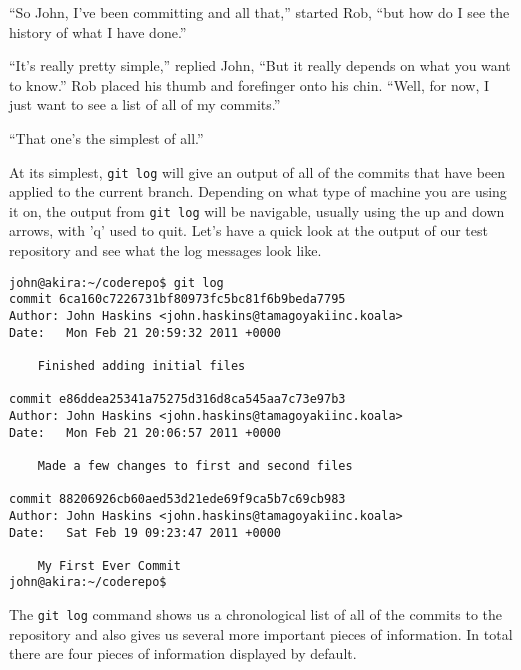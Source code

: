 \begin{trenches}
``So John, I've been committing and all that,'' started Rob, ``but how do I see the history of what I have done.''

``It's really pretty simple,'' replied John, ``But it really depends on what you want to know.''
Rob placed his thumb and forefinger onto his chin.  ``Well, for now, I just want to see a list of all of my commits.''

``That one's the simplest of all.''
\end{trenches}

At its simplest, \texttt{git log} will give an output of all of the commits that have been applied to the current branch.  Depending on what type of machine you are using it on, the output from \texttt{git log} will be navigable, usually using the up and down arrows, with 'q' used to quit.  Let's have a quick look at the output of our test repository and see what the log messages look like.

\begin{Verbatim}[frame=leftline,framerule=1mm,fontsize=\relsize{-3}] 
john@akira:~/coderepo$ git log
commit 6ca160c7226731bf80973fc5bc81f6b9beda7795
Author: John Haskins <john.haskins@tamagoyakiinc.koala>
Date:   Mon Feb 21 20:59:32 2011 +0000

    Finished adding initial files

commit e86ddea25341a75275d316d8ca545aa7c73e97b3
Author: John Haskins <john.haskins@tamagoyakiinc.koala>
Date:   Mon Feb 21 20:06:57 2011 +0000

    Made a few changes to first and second files

commit 88206926cb60aed53d21ede69f9ca5b7c69cb983
Author: John Haskins <john.haskins@tamagoyakiinc.koala>
Date:   Sat Feb 19 09:23:47 2011 +0000

    My First Ever Commit
john@akira:~/coderepo$ 
\end{Verbatim}

The \texttt{git log} command shows us a chronological list of all of the commits to the repository and also gives us several more important pieces of information.  In total there are four pieces of information displayed by default.

